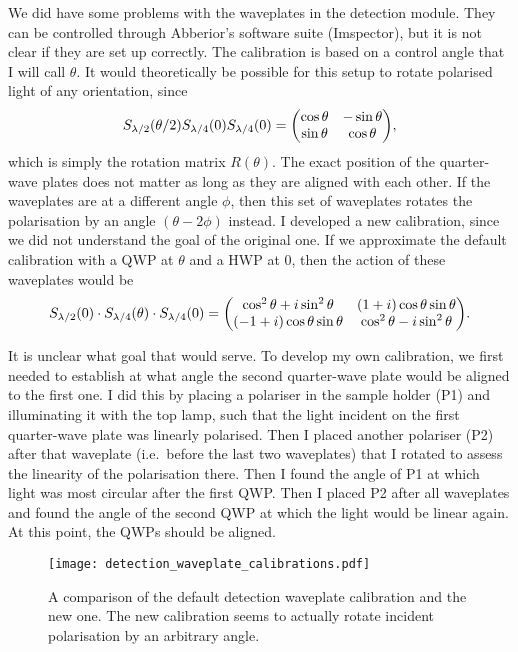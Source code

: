 We did have some problems with the waveplates in the detection module. They can be controlled through Abberior's software suite (Imspector), but it is not clear if they are set up correctly. The calibration is based on a control angle that I will call $ \theta $. It would theoretically be possible for this setup to rotate polarised light of any orientation, since
\begin{equation}
	S_\hwp(\theta/2) S_\qwp(0) S_\qwp(0) = \mqty(\cos\theta & -\sin\theta \\ \sin\theta & \cos\theta ),
	\label{eq:detection waveplates}
\end{equation}
which is simply the rotation matrix $ R(\theta) $. The exact position of the quarter-wave plates does not matter as long as they are aligned with each other. If the waveplates are at a different angle $ \phi $, then this set of waveplates rotates the polarisation by an angle $ (\theta-2\phi) $ instead. I developed a new calibration, since we did not understand the goal of the original one. If we approximate the default calibration with a QWP at $ \theta $ and a HWP at 0, then the action of these waveplates would be
\begin{equation}
	S_\hwp(0)\cdot S_\qwp(\theta)\cdot S_\qwp(0) = 
		\mqty( \cos^2\theta + i\sin^2\theta & (1+i)\cos\theta\sin\theta \\
			   (-1+i)\cos\theta\sin\theta   & \cos^2\theta - i\sin^2\theta 
	    ).
\end{equation}

It is unclear what goal that would serve. To develop my own calibration, we first needed to establish at what angle the second quarter-wave plate would be aligned to the first one. I did this by placing a polariser in the sample holder (P1) and illuminating it with the top lamp, such that the light incident on the first quarter-wave plate was linearly polarised. Then I placed another polariser (P2) after that waveplate (i.e.~before the last two waveplates) that I rotated to assess the linearity of the polarisation there. Then I found the angle of P1 at which light was most circular after the first QWP. Then I placed P2 after all waveplates and found the angle of the second QWP at which the light would be linear again. At this point, the QWPs should be aligned.

\begin{figure}[h]
	\centering
	\texttt{[image: detection\_waveplate\_calibrations.pdf]}
	\caption{
		A comparison of the default detection waveplate calibration and the new one. The new calibration seems to actually rotate incident polarisation by an arbitrary angle.
	}
	\label{fig:detection waveplate calibrations}
\end{figure}


